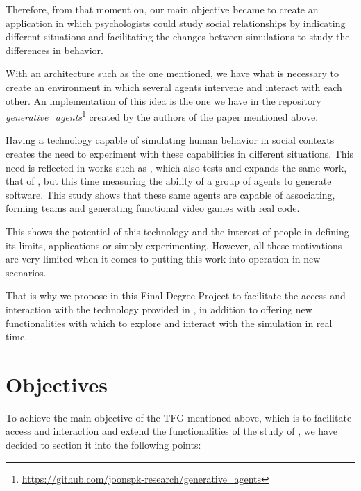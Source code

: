 Therefore, from that moment on, our main objective became to create an application in which psychologists could study social relationships by indicating different situations and facilitating the changes between simulations to study the differences in behavior.

With an architecture such as the one mentioned, we have what is necessary to create an environment in which several agents intervene and interact with each other. An implementation of this idea is the one we have in the repository {\textit{generative\_agents}}\footnote{\url{https://github.com/joonspk-research/generative_agents}} created by the authors of the paper mentioned above.

Having a technology capable of simulating human behavior in social contexts creates the need to experiment with these capabilities in different situations. This need is reflected in works such as \cite{qian2023communicative}, which also tests and expands the same work, that of \cite{park2023generative}, but this time measuring the ability of a group of agents to generate software. This study shows that these same agents are capable of associating, forming teams and generating functional video games with real code.

This shows the potential of this technology and the interest of people in defining its limits, applications or simply experimenting. However, all these motivations are very limited when it comes to putting this work into operation in new scenarios.

That is why we propose in this Final Degree Project to facilitate the access and interaction with the technology provided in \ga, in addition to offering new functionalities with which to explore and interact with the simulation in real time.

\section*{Objectives}

To achieve the main objective of the TFG mentioned above, which is to facilitate access and interaction and extend the functionalities of the study of \ga, we have decided to section it into the following points:

